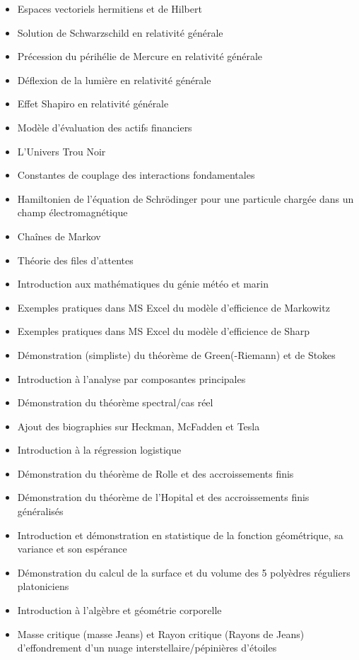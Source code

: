 \documentclass[12pt,a4paper,twoside,openright]{report}
\theoremstyle{definition}
\theoremstyle{itexmp}
\numberwithin{equation}{section}
\begin{document}
\begin{itemize}
\begin{itemize}[noitemsep]
				\item Espaces vectoriels hermitiens et de Hilbert
				\item Solution de Schwarzschild en relativité générale
				\item Précession du périhélie de Mercure en relativité générale
				\item Déflexion de la lumière en relativité générale
				\item Effet Shapiro en relativité générale
				\item Modèle d'évaluation des actifs financiers
				\item L'Univers Trou Noir
				\item Constantes de couplage des interactions fondamentales
				\item Hamiltonien de l'équation de Schrödinger pour une particule chargée dans un champ électromagnétique
				\item Chaînes de Markov
				\item Théorie des files d'attentes
				\item Introduction aux mathématiques du génie météo et marin
				\item Exemples pratiques dans MS Excel du modèle d'efficience de Markowitz
				\item Exemples pratiques dans MS Excel du modèle d'efficience de Sharp
				\item Démonstration (simpliste) du théorème de Green(-Riemann) et de Stokes
				\item Introduction à l'analyse par composantes principales
				\item Démonstration du théorème spectral/cas réel
				\item Ajout des biographies sur Heckman, McFadden et Tesla
				\item Introduction à la régression logistique
				\item Démonstration du théorème de Rolle et des accroissements finis
				\item Démonstration du théorème de l'Hopital et des accroissements finis généralisés
				\item Introduction et démonstration en statistique de la fonction géométrique, sa variance et son espérance
				\item Démonstration du calcul de la surface et du volume des 5 polyèdres réguliers platoniciens
				\item Introduction à l'algèbre et géométrie corporelle
				\item Masse critique (masse Jeans) et Rayon critique (Rayons de Jeans) d'effondrement d'un nuage interstellaire/pépinières d'étoiles

\end{itemize}
\end{itemize}
\end{document}
